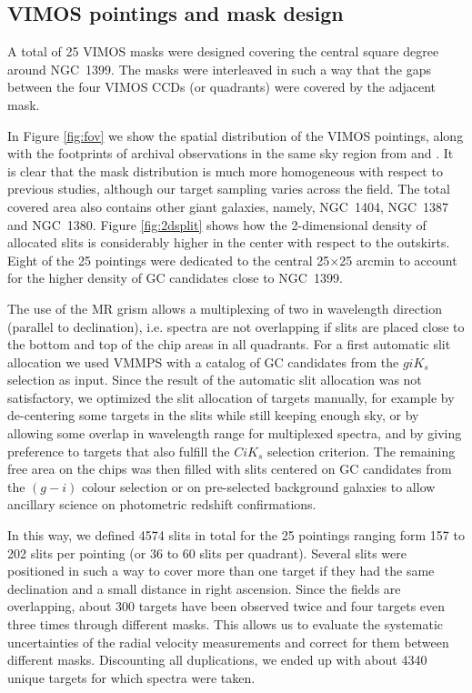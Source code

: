 \subsection{VIMOS pointings and mask design}
\label{sec:VIMOSpointings}

A total of 25 VIMOS masks were designed covering the central square degree 
around NGC~1399. The masks were interleaved in such a way that the gaps between 
the four VIMOS CCDs (or quadrants) were covered by the adjacent mask. 

In Figure \ref{fig:fov} we show the spatial distribution of the VIMOS 
pointings, along with the footprints of archival observations in the same sky 
region from \citet{Schuberth} and \citet{Bergond07}. It is clear that the mask 
distribution is much more homogeneous with respect to previous studies, 
although our target sampling varies across the field. The total covered area 
also contains other giant galaxies, namely, NGC~1404, NGC~1387 and NGC~1380.  
Figure \ref{fig:2dsplit} shows how the 2-dimensional density of allocated slits 
is considerably higher in the center with respect to the outskirts. Eight of 
the 25 pointings were dedicated to the central 25$\times$25 arcmin to account 
for the higher density of GC candidates close to NGC~1399. 

The use of the MR grism allows a multiplexing of two in wavelength direction 
(parallel to declination), i.e. spectra are not overlapping if slits are placed 
close to the bottom and top of the chip areas in all quadrants. 
For a first automatic slit allocation we used VMMPS with a catalog of GC 
candidates from the $giK_s$ selection as input. Since the result of the 
automatic slit allocation was not satisfactory, we optimized the slit 
allocation of targets manually, for example by de-centering some targets in the 
slits while still keeping enough sky, or by allowing some overlap in wavelength 
range for multiplexed spectra, and by giving preference to targets that also 
fulfill the $CiK_s$ selection criterion. The remaining free area on the chips 
was then filled with slits centered on GC candidates from the $(g-i)$ colour 
selection or on pre-selected background galaxies to allow ancillary science on 
photometric redshift confirmations.

In this way, we defined 4574 slits in total for the 25 pointings ranging form 
157 to 202 slits per pointing (or 36 to 60 slits per quadrant). Several slits 
were positioned in such a way to cover more than one target if they had the 
same declination and a small distance in right ascension. Since the fields are 
overlapping, about 300 targets have been observed twice and four targets even 
three times through different masks. This allows us to evaluate the systematic 
uncertainties of the radial velocity measurements and correct for them between 
different masks. Discounting all duplications, we ended up with about 4340 
unique targets
for which spectra were taken. 


